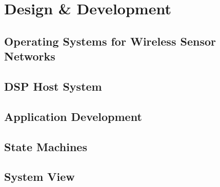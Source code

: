 



\part{Design \& Development} 
\chapter{Operating Systems for Wireless Sensor Networks}



\chapter{DSP Host System}



\chapter{Application Development}


\chapter{State Machines}



\chapter{System View}









